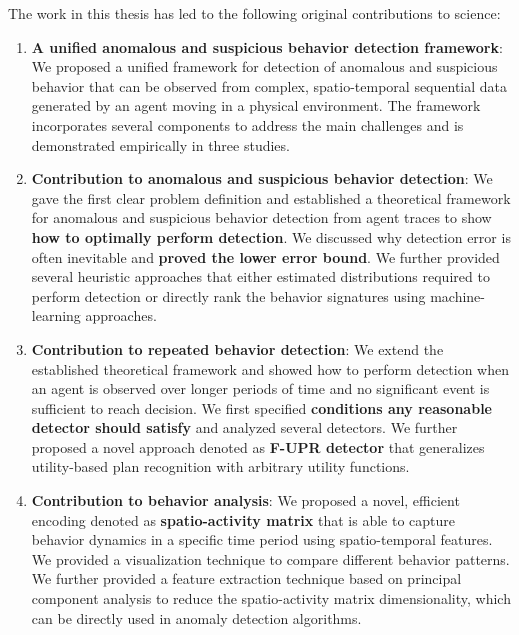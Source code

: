 The work in this thesis has led to the following original contributions to science:
\begin{enumerate}

	\item \textbf{A unified anomalous and suspicious behavior detection framework}:
	We proposed a unified framework for detection of anomalous and suspicious behavior that can be observed from complex, spatio-temporal sequential data generated by an agent moving in a physical environment. The framework incorporates several components to address the main challenges and is demonstrated empirically in three studies. 

	\item \textbf{Contribution to anomalous and suspicious behavior detection}: We gave the first clear problem definition and established a theoretical framework for anomalous and suspicious behavior detection from agent traces to show \textbf{how to optimally perform detection}. We discussed why detection error is often inevitable and \textbf{proved the lower error bound}. We further provided several heuristic approaches that either estimated distributions required to perform detection or directly rank the behavior signatures using machine-learning approaches.

	\item \textbf{Contribution to repeated behavior detection}: We extend the established theoretical framework and showed how to perform detection when an agent is observed over longer periods of time and no significant event is sufficient to reach decision. We first specified \textbf{conditions any reasonable detector should satisfy} and analyzed several detectors. We further proposed a novel approach denoted as \textbf{F-UPR detector} that generalizes utility-based plan recognition with arbitrary utility functions.
	
	\item \textbf{Contribution to behavior analysis}: We proposed a novel, efficient encoding denoted as \textbf{spatio-activity matrix} that is able to capture behavior dynamics in a specific time period using spatio-temporal features. We provided a visualization technique to compare different  behavior patterns. We further provided a feature extraction technique based on principal component analysis to reduce the spatio-activity matrix dimensionality, which can be directly used in anomaly detection algorithms.
	

\end{enumerate}
